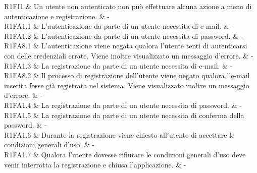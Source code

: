 














R1FI1 & Un utente non autenticato non può effettuare alcuna azione a meno di autenticazione e registrazione. & - \\

R1FA1.1 & L'autenticazione da parte di un utente necessita di e-mail. & - \\

R1FA1.2 & L'autenticazione da parte di un utente necessita di password.  & - \\

R1FA8.1 & L'autenticazione viene negata qualora l'utente tenti di autenticarsi con delle credenziali errate. Viene inoltre visualizzato un messaggio d'errore. & - \\

R1FA1.3 & La registrazione da parte di un utente necessita di e-mail. & - \\

R1FA8.2 & Il processo di registrazione dell'utente viene negato qualora l'e-mail inserita fosse già registrata nel sistema. Viene visualizzato inoltre un messaggio d'errore. & - \\

R1FA1.4 & La registrazione da parte di un utente necessita di password. & - \\

R1FA1.5 & La registrazione da parte di un utente necessita di conferma della password. & - \\

R1FA1.6 & Durante la registrazione viene chiesto all'utente di accettare le condizioni generali d'uso. & - \\

R1FA1.7 & Qualora l'utente dovesse rifiutare le condizioni generali d'uso deve venir interrotta la registrazione e chiusa l'applicazione. & - \\

